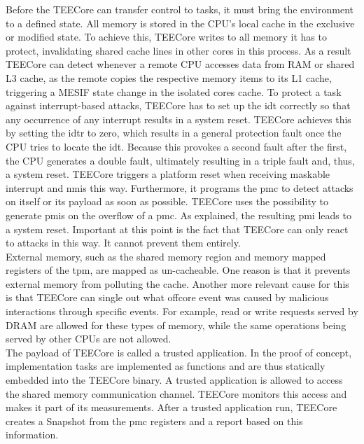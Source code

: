 Before the TEECore can transfer control to tasks, it must bring the environment
to a defined state. All memory is stored in the CPU's local cache in the
exclusive or modified state. To achieve this, TEECore writes to all memory it
has to protect, invalidating shared cache lines in other cores in this process.
As a result TEECore can detect whenever a remote CPU accesses data from RAM or
shared L3 cache, as the remote copies the respective memory items to its L1
cache, triggering a MESIF state change in the isolated cores cache. To protect a
task against interrupt-based attacks, TEECore has to set up the \gls{idt}
correctly so that any occurrence of any interrupt results in a system reset.
TEECore achieves this by setting the \gls{idtr} to zero, which results in a
general protection fault once the CPU tries to locate the \gls{idt}. Because
this provokes a second fault after the first, the CPU generates a double fault,
ultimately resulting in a triple fault and, thus, a system reset. TEECore
triggers a platform reset when receiving maskable interrupt and \glspl{nmi} this
way. Furthermore, it programs the \gls{pmc} to detect attacks on itself or its
payload as soon as possible. TEECore uses the possibility to generate
\glspl{pmi} on the overflow of a \gls{pmc}. As explained, the resulting
\gls{pmi} leads to a system reset. Important at this point is the fact that
TEECore can only react to attacks in this way. It cannot prevent them
entirely.\\

External memory, such as the shared memory region and memory mapped registers of
the \gls{tpm}, are mapped as un-cacheable. One reason is that it prevents
external memory from polluting the cache. Another more relevant cause for this
is that TEECore can single out what offcore event was caused by malicious
interactions through specific events. For example, read or write requests served
by DRAM are allowed for these types of memory, while the same operations being
served by other CPUs are not allowed.\\

The payload of TEECore is called a trusted application. In the proof of concept,
implementation tasks are implemented as functions and are thus statically
embedded into the TEECore binary. A trusted application is allowed to access the
shared memory communication channel. TEECore monitors this access and makes it
part of its measurements. After a trusted application run, TEECore
creates a Snapshot from the \gls{pmc} registers and a report based on this
information.

